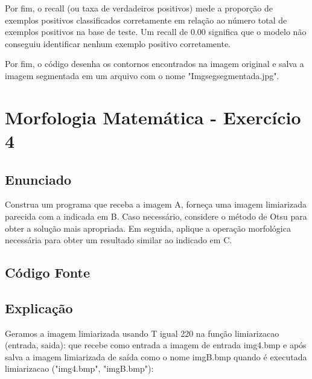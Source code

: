 \documentclass[10pt,a4paper]{article}
\begin{document}
Por fim, o recall (ou taxa de verdadeiros positivos) mede a proporção de exemplos positivos classificados corretamente em relação ao número total de exemplos positivos na base de teste. Um recall de 0.00 significa que o modelo não conseguiu identificar nenhum exemplo positivo corretamente. 

Por fim, o código desenha os contornos encontrados na imagem original e salva a imagem segmentada em um arquivo com o nome "Img\textunderscore seg\textunderscore segmentada.jpg". 

\pagebreak

\section{Morfologia Matemática - Exercício 4}

\subsection{Enunciado}

\begin{flushleft}
Construa um programa que receba a imagem A, forneça uma imagem limiarizada parecida com a indicada em B. Caso necessário, considere o método de Otsu para obter a solução mais apropriada. Em seguida, aplique a operação morfológica necessária para obter um resultado similar ao indicado em C.
\end{flushleft}

\begin{figure}[H]
    \centering
    \qquad
    \qquad
    \qquad
\end{figure}

\subsection{Código Fonte}



\subsection{Explicação}

\begin{flushleft}
Geramos a imagem limiarizada usando T igual 220 na função {\ttfamily limiarizacao (entrada, saida):} que recebe como entrada a imagem de entrada img4.bmp e após salva a imagem limiarizada de saída como o nome imgB.bmp quando é executada {\ttfamily limiarizacao ("img4.bmp", "imgB.bmp"):} 
\end{flushleft}
\end{document}
